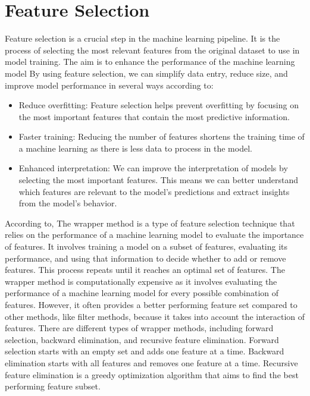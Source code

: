 \documentclass[12pt]{report}
\begin{document}
\section*{Feature Selection}
Feature selection is a crucial step in the machine learning pipeline. It is the
process of selecting the most relevant features from the original dataset to
use in model training. The aim is to enhance the performance of the machine
learning model By using feature selection, we can simplify data entry, reduce
size, and improve model performance in several ways according to\cite{guyon2003introduction}:

\begin{itemize}
    \item Reduce overfitting: Feature selection helps prevent overfitting by focusing on
          the most important features that contain the most predictive information.
    \item Faster training: Reducing the number of features shortens the training time of
          a machine learning as there is less data to process in the model.
    \item Enhanced interpretation: We can improve the interpretation of models by
          selecting the most important features. This means we can better understand
          which features are relevant to the model's predictions and extract insights
          from the model's behavior.

\end{itemize}

According to\cite{kohavi1997}, The wrapper method is a type of feature
selection technique that relies on the performance of a machine learning model
to evaluate the importance of features. It involves training a model on a
subset of features, evaluating its performance, and using that information to
decide whether to add or remove features. This process repeats until it reaches
an optimal set of features. The wrapper method is computationally expensive as
it involves evaluating the performance of a machine learning model for every
possible combination of features. However, it often provides a better
performing feature set compared to other methods, like filter methods, because
it takes into account the interaction of features. There are different types of
wrapper methods, including forward selection, backward elimination, and
recursive feature elimination. Forward selection starts with an empty set and
adds one feature at a time. Backward elimination starts with all features and
removes one feature at a time. Recursive feature elimination is a greedy
optimization algorithm that aims to find the best performing feature subset.\\
\end{document}
